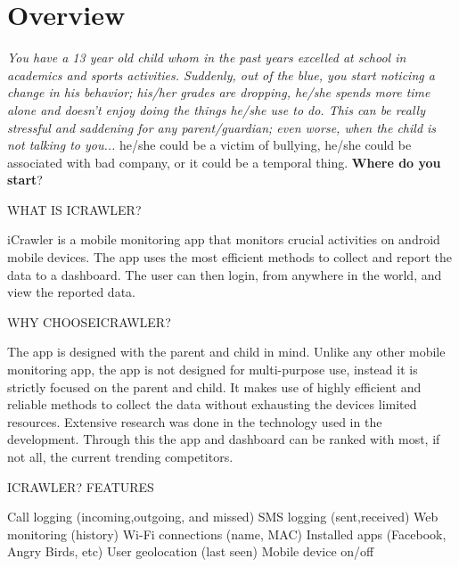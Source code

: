 \documentclass[hidelinks, 12pt, oneside]{article}
\begin{document}
	
	\tableofcontents
	\newpage
	
	\section{Overview}
	\emph{You have a 13 year old child whom in the past years excelled at school in academics and sports activities. Suddenly, out of the blue, you start noticing a change in his behavior; his/her grades are dropping, he/she spends more time alone and doesn’t enjoy doing the things he/she use to do. This can be really stressful and saddening for any parent/guardian; even worse, when the child is not talking to you...}
	he/she could be a victim of bullying, he/she could be associated with bad company, or it could be a temporal thing. \textbf{Where do you start}?
	\newline
	 
	 \uppercase{What is \MakeLowercase iCrawler?}
	 \begin{flushleft}
	 iCrawler is a mobile monitoring app that monitors crucial activities on android mobile devices.	
	The app uses the most efficient methods to collect and report the data to a dashboard.
	The user can then login, from anywhere in the world, and view the reported data.
	\end{flushleft}
	
	\uppercase{Why choose\MakeLowercase iCrawler?}
	 \begin{flushleft}
	 The app is designed with the parent and child in mind. Unlike any other mobile monitoring app, the app is not designed for multi-purpose use, instead it is strictly focused on the parent and child. It makes use of highly efficient and reliable methods to collect the data without exhausting the devices limited resources. Extensive research was done in the technology used in the development. Through this the app and dashboard can be ranked with most, if not all, the current trending competitors.
	\end{flushleft}
	
	\uppercase{\MakeLowercase iCrawler? features}
	 \begin{flushleft}
	 Call logging (incoming,outgoing, and missed)\newline
	SMS logging (sent,received)\newline
	Web monitoring (history)\newline
	Wi-Fi connections (name, MAC)\newline
	Installed apps (Facebook, Angry Birds, etc)\newline
	User geolocation (last seen)\newline
	Mobile device on/off
	\end{flushleft}
	\newpage
	
\end{document}
